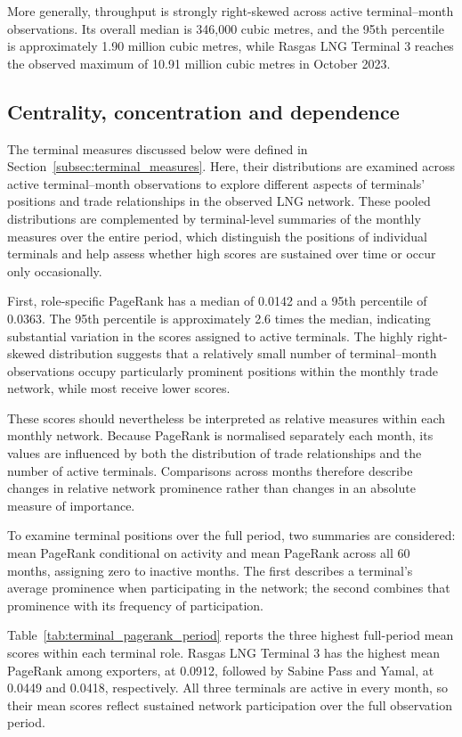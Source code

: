 \documentclass[pdftex,12pt,openright,a4paper,oneside]{book}
\begin{document}
More generally, throughput is strongly right-skewed across active terminal--month observations. 
Its overall median is 346,000 cubic metres, and the 95th percentile is approximately 1.90 million cubic metres, while Rasgas LNG Terminal 3 reaches the observed maximum of 10.91 million cubic metres in October 2023. 

\subsection{Centrality, concentration and dependence}
\label{subsec:terminal_criticality_eda}

The terminal measures discussed below were defined in Section~\ref{subsec:terminal_measures}. Here, their distributions are examined across active terminal--month observations to explore different aspects of terminals' positions and trade relationships in the observed LNG network. 
These pooled distributions are complemented by terminal-level summaries of the monthly measures over the entire period, which distinguish the positions of individual terminals and help assess whether high scores are sustained over time or occur only occasionally.

First, role-specific PageRank has a median of 0.0142 and a 95th percentile of 0.0363. 
The 95th percentile is approximately 2.6 times the median, indicating substantial variation in the scores assigned to active terminals. 
The highly right-skewed distribution suggests that a relatively small number of terminal--month observations occupy particularly prominent positions within the monthly trade network, while most receive lower scores.

These scores should nevertheless be interpreted as relative measures within each monthly network. Because PageRank is normalised separately each month, its values are influenced by both the distribution of trade relationships and the number of active terminals. Comparisons across months therefore describe changes in relative network prominence rather than changes in an absolute measure of importance.

To examine terminal positions over the full period, two summaries are considered: mean PageRank conditional on activity and mean PageRank across all 60 months, assigning zero to inactive months. 
The first describes a terminal's average prominence when participating in the network; the second combines that prominence with its frequency of participation. 

Table~\ref{tab:terminal_pagerank_period} reports the three highest full-period mean scores within each terminal role. 
Rasgas LNG Terminal 3 has the highest mean PageRank among exporters, at 0.0912, followed by Sabine Pass and Yamal, at 0.0449 and 0.0418, respectively. 
All three terminals are active in every month, so their mean scores reflect sustained network participation over the full observation period.
\end{document}
